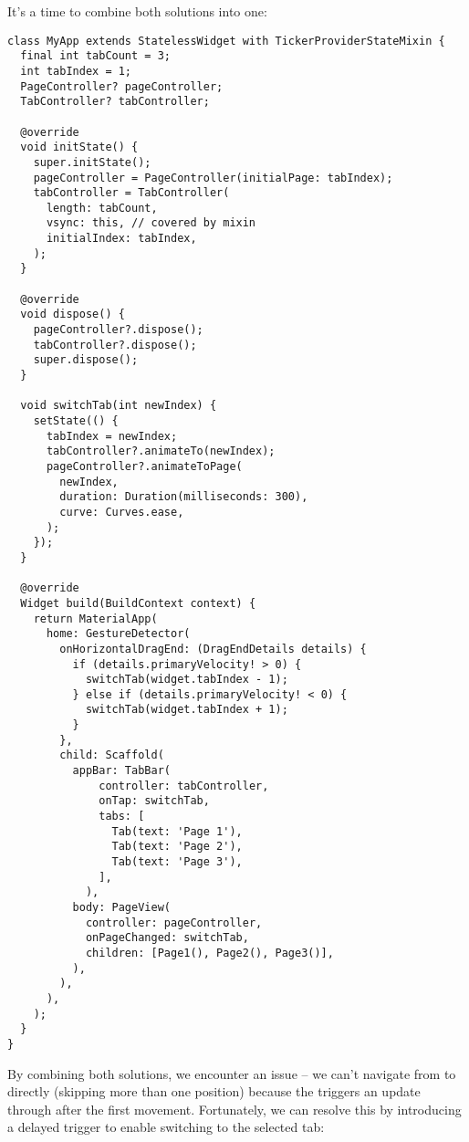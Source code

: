 \noindent It's a time to combine both solutions into one:

\begin{lstlisting}
class MyApp extends StatelessWidget with TickerProviderStateMixin {
  final int tabCount = 3;
  int tabIndex = 1;
  PageController? pageController;
  TabController? tabController;

  @override
  void initState() {
    super.initState();
    pageController = PageController(initialPage: tabIndex);
    tabController = TabController(
      length: tabCount,
      vsync: this, // covered by mixin
      initialIndex: tabIndex,
    );
  }

  @override
  void dispose() {
    pageController?.dispose();
    tabController?.dispose();
    super.dispose();
  }

  void switchTab(int newIndex) {
    setState(() {
      tabIndex = newIndex;
      tabController?.animateTo(newIndex);
      pageController?.animateToPage(
        newIndex,
        duration: Duration(milliseconds: 300),
        curve: Curves.ease,
      );
    });
  }

  @override
  Widget build(BuildContext context) {
    return MaterialApp(
      home: GestureDetector(
        onHorizontalDragEnd: (DragEndDetails details) {
          if (details.primaryVelocity! > 0) {
            switchTab(widget.tabIndex - 1);
          } else if (details.primaryVelocity! < 0) {
            switchTab(widget.tabIndex + 1);
          }
        },
        child: Scaffold(
          appBar: TabBar(
              controller: tabController,
              onTap: switchTab,
              tabs: [
                Tab(text: 'Page 1'),
                Tab(text: 'Page 2'),
                Tab(text: 'Page 3'),
              ],
            ),
          body: PageView(
            controller: pageController,
            onPageChanged: switchTab,
            children: [Page1(), Page2(), Page3()],
          ),
        ),
      ),
    );
  }
}
\end{lstlisting}

\noindent By combining both solutions, we encounter an issue -- we can't navigate from  to  directly 
(skipping more than one position) because the  triggers an update through  after the 
first movement. Fortunately, we can resolve this by introducing a delayed trigger to enable switching to the selected 
tab:


